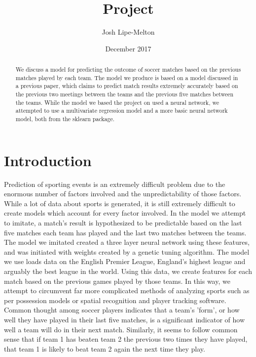\documentclass{article}
\title{Project}
\author{Josh Lipe-Melton}
\date{December 2017}
\begin{document}
\maketitle

\begin{abstract}
We discuss a model for predicting the outcome of soccer matches based on the previous matches played by each team. The model we produce is based on a model discussed in a previous paper, which claims to predict match results extremely accurately based on the previous two meetings between the teams and the previous five matches between the teams. While the model we based the project on used a neural network, we attempted to use a multivariate regression model and a more basic neural network model, both from the sklearn package.
\end{abstract}

\section{Introduction}
Prediction of sporting events is an extremely difficult problem due to the enormous number of factors involved and the unpredictability of those factors. While a lot of data about sports is generated, it is still extremely difficult to create models which account for every factor involved. In the model we attempt to imitate, a match's result is hypothesized to be predictable based on the last five matches each team has played and the last two matches between the teams. The model we imitated created a three layer neural network using these features, and was initiated with weights created by a genetic tuning algorithm. The model we use loads data on the English Premier League, England's highest league and arguably the best league in the world. Using this data, we create features for each match based on the previous games played by those teams. In this way, we attempt to circumvent far more complicated methods of analyzing sports such as per possession models or spatial recognition and player tracking software. Common thought among soccer players indicates that a team's 'form', or how well they have played in their last five matches, is a significant indicator of how well a team will do in their next match. Similarly, it seems to follow common sense that if team 1 has beaten team 2 the previous two times they have played, that team 1 is likely to beat team 2 again the next time they play.
\end{document}
